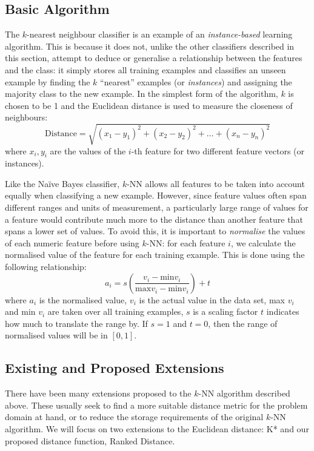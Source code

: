 \subsection{Basic Algorithm}
The $k$-nearest neighbour classifier is an example of an
\textit{instance-based} learning algorithm. This is because it does not, unlike
the other classifiers described in this section, attempt to deduce or
generalise a relationship between the features and the class: it simply stores
all training examples and classifies an unseen example by finding the $k$
``nearest'' examples (or \textit{instances}) and assigning the majority class
to the new example. In the simplest form of the algorithm, $k$ is chosen to be
1 and the Euclidean distance is used to measure the closeness of neighbours:
\begin{equation*}
\mathrm{Distance} = \sqrt{(x_1-y_1)^2 + (x_2-y_2)^2 + \ldots + (x_n-y_n)^2}
\end{equation*}
where $x_i,y_i$ are the values of the $i$-th feature for two different feature
vectors (or instances).

Like the Na\"{i}ve Bayes classifier, $k$-NN allows all features to be taken
into account equally when classifying a new example. However, since feature
values often span different ranges and units of measurement, a particularly
large range of values for a feature would contribute much more to the distance
than another feature that spans a lower set of values.
To avoid this, it is important to \textit{normalise} the
values of each numeric feature before using $k$-NN: for each feature $i$, we
calculate the normalised value of the feature for each training example. This
is done using the following relationship:
\begin{equation*}
a_i = s\left(\dfrac{v_i - \mathrm{min }v_i}{\mathrm{max }v_i - \mathrm{min }v_i}\right) + t
\end{equation*}
where $a_i$ is the normalised value, $v_i$ is the actual value in the data
set, max $v_i$ and min $v_i$ are taken over all training examples, $s$ is a
scaling factor $t$ indicates how much to translate the range by. If $s=1$
and $t=0$, then the range of normalised values will be in $[0,1]$.

\subsection{Existing and Proposed Extensions}
There have been many extensions proposed to the $k$-NN algorithm described
above. These usually seek to find a more suitable distance metric for the
problem domain at hand, or to reduce the storage requirements of the original
$k$-NN algorithm. We will focus on two extensions to the Euclidean distance:
K* and our proposed distance function, Ranked Distance.

